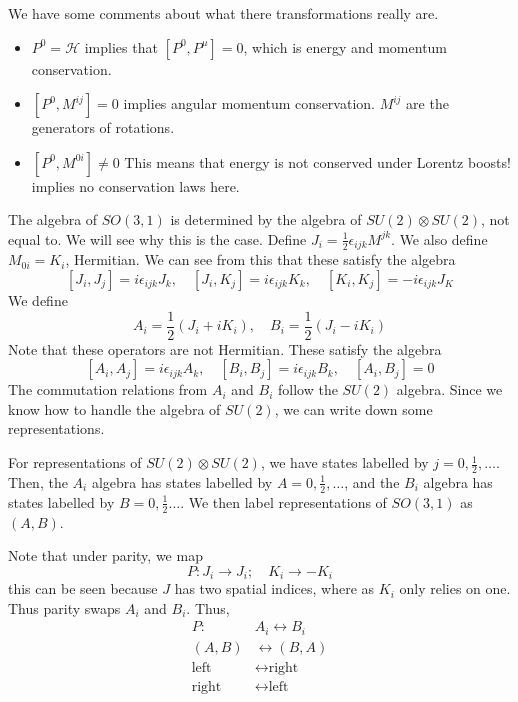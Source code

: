\documentclass[11pt, oneside]{article}   	%
\theoremstyle{slanted}
\begin{document}
We have some comments about 
what there transformations really are. 
\begin{itemize}
	\item $ P ^ 0 = \mathcal{ H }  $  implies that $ \left[  
		P ^ 0 , P ^ \mu \right]   =0   $, which 
		is energy and momentum conservation. 
	\item $ \left[  P ^ 0 , M ^{ ij }  \right]   =0 $ implies 
		angular momentum conservation. 
		$ M ^{ ij } $ are the generators 
		of rotations.
	\item $ \left[  P ^ 0 , M ^{ 0i }  \right] \neq  0  $ 
		This means that energy is not conserved 
		under Lorentz boosts! 
		implies no conservation laws here. 

\end{itemize}

The algebra of $ SO ( 3, 1 ) $
is determined by the 
algebra of $ SU ( 2 ) \otimes SU ( 2 )  $,
not equal to. We will see why 
this is the case. 
Define $ J _ i  = \frac{1}{2 } \epsilon _{ ij k } M ^{ jk } $. 
We also define $ M _{ 0i  } = K _ i  $, Hermitian. 
We can see from this that 
these satisfy the algebra 
\[
 \left[  J _ i , J _ j  \right]   = 
  i \epsilon _{ i j k  } J _ k, \quad 
  \left[  J _ i , K _ j  \right]  = 
  i \epsilon _{ ij k  } K _ k , \quad 
  \left[  K _ i , K _ j  \right]   =  - i \epsilon _{ ij k  } J _ K 
\] We define 
\[
	A_ i   = \frac{1}{2 } \left( J _ i  + i K _ i   \right) , \quad 
	B _ i  = \frac{1}{2 } \left( J _ i  - i K _ i  \right) 
\] Note that these operators are not 
Hermitian. These satisfy the algebra 
\[
	\left[ A_ i , A _ j  \right]  = i \epsilon _{ ij k } A _ k , 
	\quad \left[  B _ i , B _ j  \right]   = i \epsilon _{ ij k }  B_ k , 
	\quad \left[  A _ i , B _ j  \right]   =0 
\]  The commutation relations from $A_ i $  and $ B _ i$ 
follow the $ SU ( 2 ) $ algebra. 
Since we know how to handle the 
algebra of $ SU ( 2 )  $, 
we can write down some representations. 

For representations of $ SU ( 2 ) \otimes SU ( 2  ) $, 
we have states labelled by $ j = 0 , \frac{1}{2 } , \dots $. 
Then, the $ A _ i $ algebra has states 
labelled by $  A  = 0 , \frac{1}{2 } , \dots $, 
and the $ B _ i $ algebra has states labelled by $ B  = 0 , \frac{1}{2 } \dots  $. 
We then label representations 
of $ SO ( 3, 1 ) $ as $ \left( A, B  \right)  $. 

Note that under parity, 
we map 
\[
 P : J _ i \to J _ i ; \quad K _ i \to - K _i 
\] this can be seen because $ J $ has 
two spatial indices, where as $ K _ i $ only relies on one. 
Thus parity swaps $ A _ i $ and $ B _ i $. 
Thus, 
\begin{align*}
	P : & A _ i \leftrightarrow B_ i \\ 
	\left( A, B  \right)  & \leftrightarrow \left( B , A  \right)  \\
	\text{left} & \leftrightarrow \text{right} \\
	\text{right} & \leftrightarrow \text{left} 
\end{align*}
\end{document}
